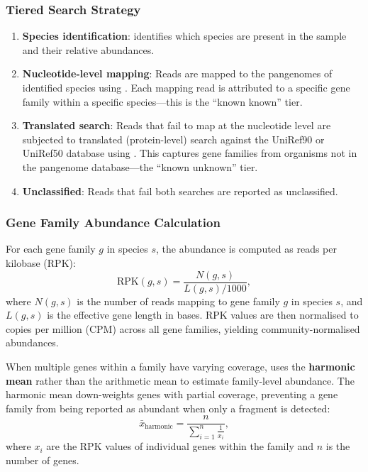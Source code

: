 \subsubsection{Tiered Search Strategy}

\begin{enumerate}[nosep]
  \item \textbf{Species identification}:  identifies which species are present in the sample and their relative abundances.
  \item \textbf{Nucleotide-level mapping}: Reads are mapped to the pangenomes of identified species using . Each mapping read is attributed to a specific gene family within a specific species---this is the ``known known'' tier.
  \item \textbf{Translated search}: Reads that fail to map at the nucleotide level are subjected to translated (protein-level) search against the UniRef90 or UniRef50 database using . This captures gene families from organisms not in the pangenome database---the ``known unknown'' tier.
  \item \textbf{Unclassified}: Reads that fail both searches are reported as unclassified.
\end{enumerate}

\subsubsection{Gene Family Abundance Calculation}

For each gene family $g$ in species $s$, the abundance is computed as reads per kilobase (RPK):
\begin{equation}
\label{eq:metagenomics:rpk}
\text{RPK}(g, s) = \frac{N(g, s)}{L(g, s) / 1000},
\end{equation}
where $N(g, s)$ is the number of reads mapping to gene family $g$ in species $s$, and $L(g, s)$ is the effective gene length in bases. RPK values are then normalised to copies per million (CPM) across all gene families, yielding community-normalised abundances.

When multiple genes within a family have varying coverage,  uses the \textbf{harmonic mean} rather than the arithmetic mean to estimate family-level abundance. The harmonic mean down-weights genes with partial coverage, preventing a gene family from being reported as abundant when only a fragment is detected:
\begin{equation}
\label{eq:metagenomics:harmonic_mean}
\bar{x}_{\text{harmonic}} = \frac{n}{\sum_{i=1}^{n} \frac{1}{x_i}},
\end{equation}
where $x_i$ are the RPK values of individual genes within the family and $n$ is the number of genes.

